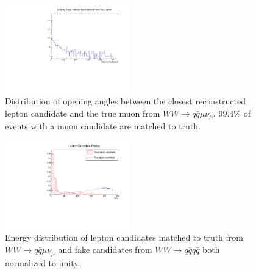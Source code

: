 \begin{figure}
\label{fig:taupsi}
\includegraphics[width=0.48\textwidth]{matchingangle.pdf}
\caption{Distribution of opening angles between the closest reconstructed lepton candidate and the true muon from $WW \rightarrow q \bar{q} \mu \nu_\mu$. $99.4\%$ of events with a muon candidate are matched to truth.} 
\end{figure}



\begin{figure}
\label{fig:candE}
\includegraphics[width=0.48\textwidth]{candEnergy.pdf}
\caption{Energy distribution of lepton candidates matched to truth from $WW \rightarrow q \bar{q} \mu \nu_\mu $ and fake candidates from $ WW \rightarrow q\bar{q} q \bar{q}$ both normalized to unity.}
\end{figure}

